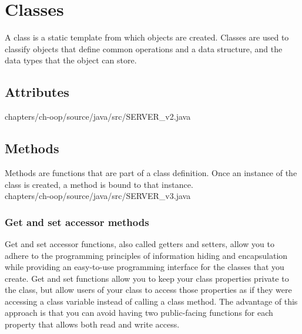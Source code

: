 \section{Classes}

A class is a static 
template from which objects are 
created. Classes are used 
to classify objects  
that define 
common operations 
and a data structure, 
and the data types
that the object can 
store.\\


%



\subsection{Attributes}
	
	{chapters/ch-oop/source/java/src/SERVER_v2.java}



\subsection{Methods}
Methods are functions that are part of a class 
definition. Once an instance of the class is created, 
a method is bound to that instance.\\
	
	{chapters/ch-oop/source/java/src/SERVER_v3.java}



	\subsubsection{Get and set accessor methods}
	Get and set accessor functions, also called getters 
	and setters, allow you to adhere to the programming principles of 
	information hiding and encapsulation while providing an 
	easy-to-use programming interface for the classes that you 
	create. Get and set functions allow you to keep your class 
	properties private to the class, but allow users of your class 
	to access those properties as if they were accessing a 
	class variable instead of calling a class method. 
	The advantage of this approach is that you can avoid 
	having two public-facing functions for each property 
	that allows both read and write access. \\

